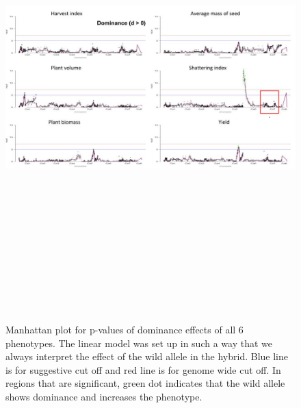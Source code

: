 \begin{figure}
    \centering
    \includegraphics[height=18cm, width=15cm]{tex/chickpea/manhattan-dom.jpg}
    \caption{Manhattan plot for p-values of dominance effects of all 6 phenotypes. The linear model was set up in such a way that we always interpret the effect of the wild allele in the hybrid. Blue line is for suggestive cut off and red line is for genome wide cut off. In regions that are significant, green dot indicates that the wild allele shows dominance and increases the phenotype.}
    \label{fig:man-dom}
\end{figure}

